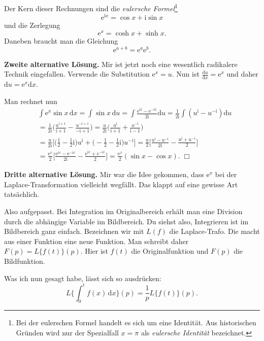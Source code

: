 \documentclass[a4paper,10pt,fleqn,twoside]{scrartcl}
\numberwithin{equation}{section}
\newcommand{\ui}{\mathrm i}
\newcommand{\ee}{\mathrm e}
\newcommand{\strong}[1]{{\sf\bfseries #1}}
\theoremstyle{Aufgabe}
\begin{document}
Der Kern dieser Rechnungen sind die
\emph{eulersche Formel}\footnote{Bei der eulerschen Formel handelt
es sich um eine Identität. Aus historischen Gründen wird nur der
Spezialfall $x=\pi$ als \emph{eulersche Identität} bezeichnet.}
\begin{equation}
\ee^{\ui x}=\cos x+\ui\sin x
\end{equation}
und die Zerlegung
\begin{equation}
\ee^{x}=\cosh x+\sinh x.
\end{equation}
Daneben braucht man die Gleichung
\begin{equation}
\ee^{a+b}=\ee^a \ee^b.
\end{equation}

\strong{Zweite alternative Lösung.}
Mir ist jetzt noch eine wesentlich radikalere Technik eingefallen.
Verwende die Substitution $\ee^x=u$. Nun ist
$\frac{\mathrm du}{\mathrm dx}=\ee^x$ und daher
$\mathrm du=\ee^x \mathrm dx$.

Man rechnet nun
\begin{align}
&\int \ee^x\sin x\,\mathrm dx
 = \int \sin x\,\mathrm du = \int\frac{\ee^{\ui x}-\ee^{-\ui x}}{2\ui}\mathrm du
 = \frac{1}{2\ui}\int (u^\ui-u^{-\ui})\mathrm du\\
&= \frac{1}{2\ui}\bigg(\frac{u^{\ui+1}}{\ui+1}-\frac{u^{-\ui+1}}{-\ui+1}\bigg)
 = \frac{u}{2\ui}\bigg(\frac{u^\ui}{\ui+1}+\frac{u^{-\ui}}{\ui-1}\bigg)\\
&= \frac{u}{2\ui}\bigg[\bigg(\frac{1}{2}-\frac{1}{2}\ui\bigg)u^\ui
   +\bigg(-\frac{1}{2}-\frac{1}{2}\ui\bigg)u^{-\ui}\bigg]
 = \frac{u}{2}\bigg[\frac{u^\ui-u^{-\ui}}{2\ui}-\frac{u^\ui+u^{-\ui}}{2}\bigg]\\
&= \frac{\ee^x}{2}\bigg[\frac{\ee^{\ui x}-\ee^{-\ui x}}{2\ui}-\frac{\ee^{\ui x}+e^{-\ui x}}{2}\bigg]
 = \frac{\ee^x}{2}(\sin x-\cos x).\;\Box
\end{align}

\strong{Dritte alternative Lösung.}
Mir war die Idee gekommen, dass $\ee^x$ bei der Laplace-Transformation
vielleicht wegfällt. Das klappt auf eine gewisse Art tatsächlich.

Also aufgepasst. Bei Integration im Originalbereich erhält man eine
Division durch die abhängige Variable im Bildbereich. Du siehst also,
Integrieren ist im Bildbereich ganz einfach. Bezeichnen wir mit
$L(f)$ die Laplace-Trafo. Die macht aus einer Funktion eine neue
Funktion. Man schreibt daher $F(p)=L\{f(t)\}(p)$. Hier ist
$f(t)$ die Originalfunktion und $F(p)$ die Bildfunktion.

Was ich nun gesagt habe, lässt sich so ausdrücken:
\begin{equation}
L\bigg\{\int_0^t f(x)\,\mathrm dx\bigg\}(p) = \frac{1}{p}L\{f(t)\}(p).
\end{equation}
\end{document}
